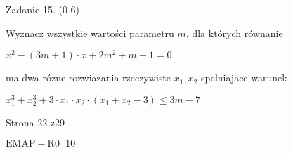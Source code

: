 \documentclass[a4paper,12pt]{article}
\begin{document}
Zadanie 15. (0-6)

Wyznacz wszystkie wartości parametru $m$, dla których równanie

$x^{2}-(3m+1)\cdot x+2m^{2}+m+1=0$

ma dwa rózne rozwiazania rzeczywiste $x_{1}, x_{2}$ spelniajace warunek

$x_{1}^{3}+x_{2}^{3}+3\cdot x_{1}\cdot x_{2}\cdot(x_{1}+x_{2}-3)\leq 3m-7$

Strona 22 z29

$\mathrm{E}\mathrm{M}\mathrm{A}\mathrm{P}-\mathrm{R}0_{-}10$
\end{document}
